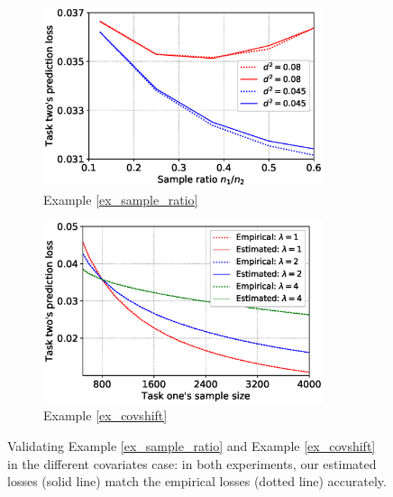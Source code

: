 \begin{figure}[!t]
	\centering
	\begin{subfigure}[b]{0.5\textwidth}
		\centering
		\includegraphics[width=0.9\textwidth]{figures/sample_ratio_several_d.eps}
		\caption{Example \ref{ex_sample_ratio}}
		\label{fig_size}
	\end{subfigure}\hfill
	\begin{subfigure}[b]{0.5\textwidth}
		\centering
		\includegraphics[width=0.9\textwidth]{figures/covariate_shift.eps}
		\caption{Example \ref{ex_covshift}}
		\label{fig_covariate}
	\end{subfigure}
	\caption{%
	Validating Example \ref{ex_sample_ratio} and Example \ref{ex_covshift} in the different covariates case:
	in both experiments, our estimated losses (solid line) match the empirical losses (dotted line) accurately.
}
\end{figure}
